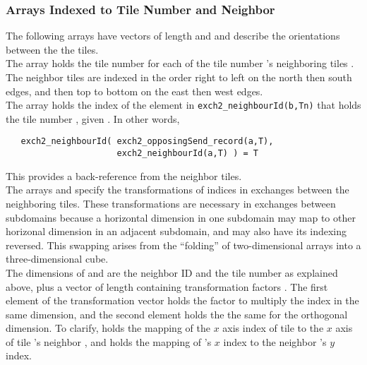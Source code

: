 \subsubsection{Arrays Indexed to Tile Number and Neighbor}

The following arrays have vectors of length  and
 and describe the orientations between the the tiles. \\

The array  holds the tile number
 for each of the tile number 's neighboring tiles
.  The neighbor tiles are indexed
 in the order right to left on the
north then south edges, and then top to bottom on the east then west
edges.  \\

 The  array holds the
index  of the element in \texttt{exch2\_neighbourId(b,Tn)}
that holds the tile number , given
.  In other words,
\begin{verbatim}
   exch2_neighbourId( exch2_opposingSend_record(a,T),
                      exch2_neighbourId(a,T) ) = T
\end{verbatim}
This provides a back-reference from the neighbor tiles. \\

The arrays  and
 specify the transformations of indices
in exchanges between the neighboring tiles.  These transformations are
necessary in exchanges between subdomains because a horizontal dimension 
in one subdomain 
may map to other horizonal dimension in an adjacent subdomain, and
may also have its indexing reversed. This swapping arises from the
``folding'' of two-dimensional arrays into a three-dimensional
cube. \\

The dimensions of  and 
are the neighbor ID  and the tile number  as explained
above, plus a vector of length  containing transformation
factors .  The first element of the transformation vector
holds the factor to multiply the index in the same dimension, and the
second element holds the the same for the orthogonal dimension.  To
clarify,  holds the mapping of the $x$ axis
index of tile  to the $x$ axis of tile 's neighbor
, and  holds the mapping of 's
$x$ index to the neighbor 's $y$ index. \\
 
